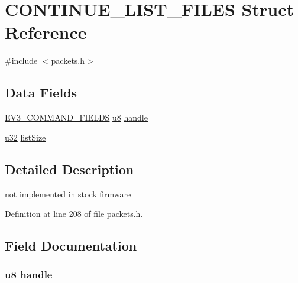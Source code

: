 \hypertarget{struct_c_o_n_t_i_n_u_e___l_i_s_t___f_i_l_e_s}{}\section{C\+O\+N\+T\+I\+N\+U\+E\+\_\+\+L\+I\+S\+T\+\_\+\+F\+I\+L\+E\+S Struct Reference}
\label{struct_c_o_n_t_i_n_u_e___l_i_s_t___f_i_l_e_s}


{\ttfamily \#include $<$packets.\+h$>$}

\subsection*{Data Fields}
\begin{DoxyCompactItemize}
\item 
\hyperlink{packets_8h_a0c26a010ef0da2962a751796943824c9}{E\+V3\+\_\+\+C\+O\+M\+M\+A\+N\+D\+\_\+\+F\+I\+E\+L\+D\+S} \hyperlink{defs_8h_a92c50087ca0e64fa93fc59402c55f8ca}{u8} \hyperlink{struct_c_o_n_t_i_n_u_e___l_i_s_t___f_i_l_e_s_aa51e1209e753b36d7bd2fd25e49a348d}{handle}
\item 
\hyperlink{defs_8h_afaa62991928fb9fb18ff0db62a040aba}{u32} \hyperlink{struct_c_o_n_t_i_n_u_e___l_i_s_t___f_i_l_e_s_abfa15b3e9c94f60be2f38c77d1dbe5ae}{list\+Size}
\end{DoxyCompactItemize}


\subsection{Detailed Description}
not implemented in stock firmware 

Definition at line 208 of file packets.\+h.



\subsection{Field Documentation}
\hypertarget{struct_c_o_n_t_i_n_u_e___l_i_s_t___f_i_l_e_s_aa51e1209e753b36d7bd2fd25e49a348d}{}
\subsubsection[{handle}]{ {\bf u8} handle}\label{struct_c_o_n_t_i_n_u_e___l_i_s_t___f_i_l_e_s_aa51e1209e753b36d7bd2fd25e49a348d}



